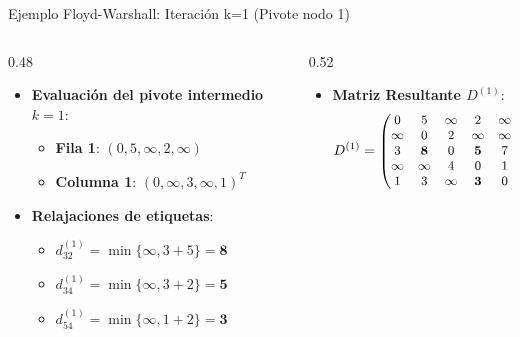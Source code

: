 \documentclass[
  ignorenonframetext,
]{beamer}
\providecommand{\tightlist}{%
  \setlength{\itemsep}{0pt}\setlength{\parskip}{0pt}}
\begin{document}
\begin{frame}{Ejemplo Floyd-Warshall: Iteración k=1 (Pivote nodo 1)}
\label{ejemplo-floyd-warshall-iteraciuxf3n-k1-pivote-nodo-1}
\begin{columns}[T]
\begin{column}{0.48\linewidth}
\begin{itemize}
\tightlist
\item
  \textbf{Evaluación del pivote intermedio \(k=1\)}:

  \begin{itemize}
  \tightlist
  \item
    \textbf{Fila 1}: \((0, 5, \infty, 2, \infty)\)
  \item
    \textbf{Columna 1}: \((0, \infty, 3, \infty, 1)^T\)
  \end{itemize}
\item
  \textbf{Relajaciones de etiquetas}:

  \begin{itemize}
  \tightlist
  \item
    \(d_{32}^{(1)} = \min \{\infty, 3 + 5\} = \mathbf{8}\)
  \item
    \(d_{34}^{(1)} = \min \{\infty, 3 + 2\} = \mathbf{5}\)
  \item
    \(d_{54}^{(1)} = \min \{\infty, 1 + 2\} = \mathbf{3}\)
  \end{itemize}
\end{itemize}
\end{column}

\begin{column}{0.52\linewidth}
\begin{itemize}
\tightlist
\item
  \textbf{Matriz Resultante \(D^{(1)}\)}: \[ \small
  D^{(1)} = \begin{pmatrix}
  0 & 5 & \infty & 2 & \infty \\
  \infty & 0 & 2 & \infty & \infty \\
  3 & \mathbf{8} & 0 & \mathbf{5} & 7 \\
  \infty & \infty & 4 & 0 & 1 \\
  1 & 3 & \infty & \mathbf{3} & 0
  \end{pmatrix}
  \]
\end{itemize}
\end{column}
\end{columns}
\end{frame}
\end{document}
